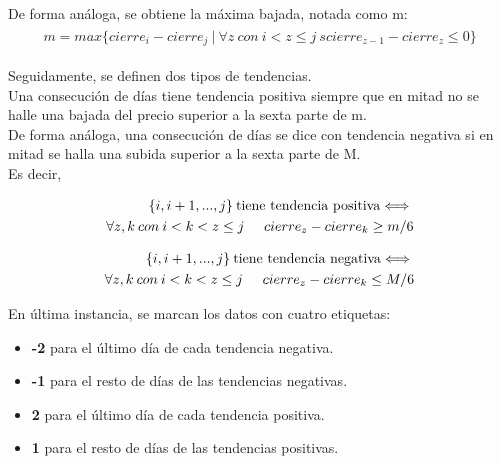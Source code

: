     De forma an\'aloga, se obtiene la m\'axima bajada, notada como m:
    \begin{align*}
    \begin{split}
        m = max\{cierre_{i} - cierre_{j} \:|\: \forall z\: con \:i < z\leq j\:s cierre_{z-1} - cierre_{z} \leq 0 \}
    \end{split}
    \end{align*}

    Seguidamente, se definen dos tipos de tendencias.\\
    
    Una consecuci\'on de d\'ias tiene tendencia positiva siempre que en mitad no se halle una bajada del precio superior a la sexta parte de m.\\
    
    De forma an\'aloga, una consecuci\'on de d\'ias se dice con tendencia negativa si en mitad se halla una subida superior a la sexta parte de M.\\
    
    Es decir,
    
    \begin{align*}
    \begin{split}
        \{i,i+1,...,j\}\: \text{tiene tendencia positiva} \Longleftrightarrow{}\\
        \forall z,k\: con \:i < k < z\leq j\hspace{0.5cm} cierre_{z} - cierre_{k} \geq m/6
    \end{split}
    \end{align*}
    
    \begin{align*}
    \begin{split}
        \{i,i+1,...,j\}\: \text{tiene tendencia negativa} \Longleftrightarrow{}\\
        \forall z,k\: con \:i < k < z\leq j\hspace{0.5cm} cierre_{z} - cierre_{k} \leq M/6
    \end{split}
    \end{align*}

    En \'ultima instancia, se marcan los datos con cuatro etiquetas:
    \begin{itemize}
        \item \textbf{-2} para el \'ultimo d\'ia de cada tendencia negativa.
        \item \textbf{-1} para el resto de d\'ias de las tendencias negativas.
        \item \textbf{2} para el \'ultimo d\'ia de cada tendencia positiva.
        \item \textbf{1} para el resto de d\'ias de las tendencias positivas.
    \end{itemize}
    
